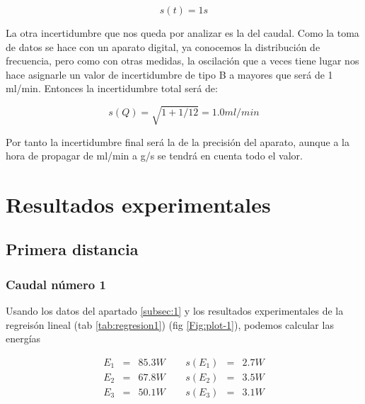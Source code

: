 \documentclass[12pt,a4paper]{article}
\begin{document}
\begin{equation}
s(t) = 1 s
\end{equation}

La otra incertidumbre que nos queda por analizar es la del caudal. Como la toma de datos se hace con un aparato digital, ya conocemos la distribución de frecuencia, pero como con otras medidas, la oscilación que a veces tiene lugar nos hace asignarle un valor de incertidumbre de tipo B a mayores que será de 1 ml/min. Entonces la incertidumbre total será de:

\begin{equation}
s(Q) = \sqrt{1+1/12} = 1.0 ml/min
\end{equation}

Por tanto la incertidumbre final será la de la precisión del aparato, aunque a la hora de propagar de ml/min a g/s se tendrá en cuenta todo el valor.  \\



\newpage

\section{Resultados experimentales}



\subsection{Primera distancia}
 
\subsubsection{Caudal número 1} 
 
Usando los datos del apartado \ref{subsec:1} y los  resultados experimentales de la regreisón lineal (tab \ref{tab:regresion1}) (fig \ref{Fig:plot-1}), podemos calcular las energías 
 
 \begin{equation} 
\begin{array}{lllllll}
E_1 & = & 85.3 W &  \ \ &  s(E_1) & =  & 2.7  W \\ 
 E_2 & = & 67.8 W &  \ \ &  s(E_2) & =  & 3.5  W \\ 
 E_3 & = & 50.1 W &  \ \ &  s(E_3) & =  & 3.1  W \\ 
 \end{array} 
\end{equation} 
 
\end{document}
